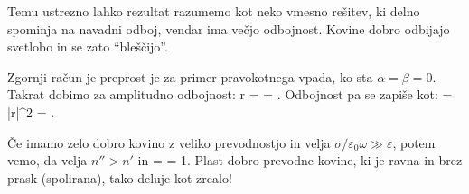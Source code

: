 Temu ustrezno lahko rezultat razumemo kot neko vmesno rešitev, ki delno spominja
na navadni odboj, vendar ima večjo odbojnost. Kovine dobro odbijajo svetlobo
in se zato ``bleščijo''. 

Zgornji račun je preprost je za primer pravokotnega vpada, ko sta $\alpha = \beta = 0$. 
Takrat dobimo za amplitudno odbojnost:
\beq
r =  = .
\eeq
Odbojnost pa se zapiše kot:
\beq
{} = |r|^2 = .
\eeq

Če imamo zelo dobro kovino z veliko prevodnostjo in velja $\sigma/\varepsilon_0 \omega \gg \varepsilon$, potem
vemo, da velja $n''> n'$ in 
\beq
{} =  = 1.
\eeq
Plast dobro prevodne kovine, ki je ravna in brez prask (spolirana), tako deluje kot zrcalo!

